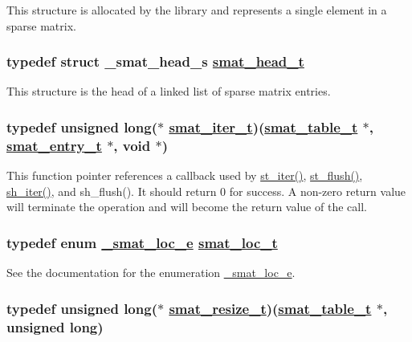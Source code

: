 This structure is allocated by the library and represents a single element in a sparse matrix. \hypertarget{group__dbprim__smat_a1}{
\subsubsection[smat\_\-head\_\-t]{\setlength{\rightskip}{0pt plus 5cm}typedef struct \_\-smat\_\-head\_\-s \hyperlink{dbprim_8h_a1}{smat\_\-head\_\-t}}}
\label{group__dbprim__smat_a1}


This structure is the head of a linked list of sparse matrix entries. \hypertarget{group__dbprim__smat_a4}{
\subsubsection[smat\_\-iter\_\-t]{\setlength{\rightskip}{0pt plus 5cm}typedef unsigned long($\ast$ \hyperlink{dbprim_8h_a4}{smat\_\-iter\_\-t})(\hyperlink{dbprim_8h_a0}{smat\_\-table\_\-t} $\ast$, \hyperlink{dbprim_8h_a2}{smat\_\-entry\_\-t} $\ast$, void $\ast$)}}
\label{group__dbprim__smat_a4}


This function pointer references a callback used by \hyperlink{group__dbprim__smat_a13}{st\_\-iter()}, \hyperlink{group__dbprim__smat_a14}{st\_\-flush()}, \hyperlink{group__dbprim__smat_a20}{sh\_\-iter()}, and sh\_\-flush(). It should return 0 for success. A non-zero return value will terminate the operation and will become the return value of the call. \hypertarget{group__dbprim__smat_a6}{
\subsubsection[smat\_\-loc\_\-t]{\setlength{\rightskip}{0pt plus 5cm}typedef enum \hyperlink{group__dbprim__smat_a47}{\_\-smat\_\-loc\_\-e} \hyperlink{dbprim_8h_a6}{smat\_\-loc\_\-t}}}
\label{group__dbprim__smat_a6}


See the documentation for the enumeration \hyperlink{group__dbprim__smat_a47}{\_\-smat\_\-loc\_\-e}. \hypertarget{group__dbprim__smat_a3}{
\subsubsection[smat\_\-resize\_\-t]{\setlength{\rightskip}{0pt plus 5cm}typedef unsigned long($\ast$ \hyperlink{dbprim_8h_a3}{smat\_\-resize\_\-t})(\hyperlink{dbprim_8h_a0}{smat\_\-table\_\-t} $\ast$, unsigned long)}}
\label{group__dbprim__smat_a3}


